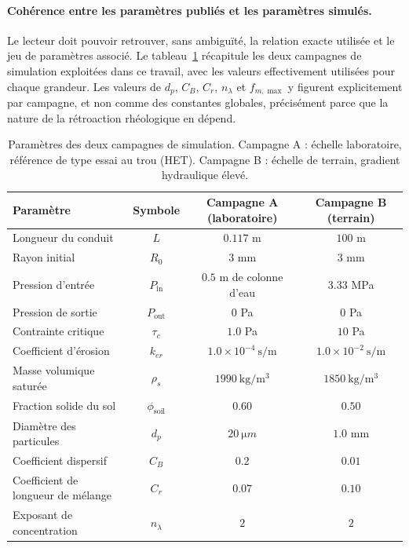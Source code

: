 \documentclass[11pt,a4paper]{report}
\newcommand{\phisol}{\phi_{\mathrm{soil}}}
\begin{document}
\paragraph{Cohérence entre les paramètres publiés et les paramètres simulés.} Le lecteur doit pouvoir
retrouver, sans ambiguïté, la relation exacte utilisée et le jeu de paramètres associé. Le
tableau~\ref{tab:param-campagnes} récapitule les deux campagnes de simulation exploitées dans ce travail,
avec les valeurs effectivement utilisées pour chaque grandeur. Les valeurs de \(d_p\), \(C_B\), \(C_r\),
\(n_\lambda\) et \(f_{m,\max}\) y figurent explicitement par campagne, et non comme des constantes
globales, précisément parce que la nature de la rétroaction rhéologique en dépend.

\begin{table}[H]
\centering
\caption{Paramètres des deux campagnes de simulation. Campagne A : échelle laboratoire, référence de
type essai au trou (HET). Campagne B : échelle de terrain, gradient hydraulique élevé.}
\label{tab:param-campagnes}
\small
\begin{tabular}{lccc}
\toprule
Paramètre & Symbole & Campagne A (laboratoire) & Campagne B (terrain) \\
\midrule
Longueur du conduit & \(L\) & \(0.117\) m & \(100\) m \\
Rayon initial & \(R_0\) & \(3\) mm & \(3\) mm \\
Pression d'entrée & \(P_{\mathrm{in}}\) & \(0.5\) m de colonne d'eau & \(3.33\) MPa \\
Pression de sortie & \(P_{\mathrm{out}}\) & \(0\) Pa & \(0\) Pa \\
Contrainte critique & \(\tau_c\) & \(1.0\) Pa & \(10\) Pa \\
Coefficient d'érosion & \(k_{er}\) & \(1.0\times10^{-4}\ \mathrm{s/m}\) & \(1.0\times10^{-2}\ \mathrm{s/m}\) \\
Masse volumique saturée & \(\rho_s\) & \(1990\ \mathrm{kg/m^3}\) & \(1850\ \mathrm{kg/m^3}\) \\
Fraction solide du sol & \(\phisol\) & \(0.60\) & \(0.50\) \\
Diamètre des particules & \(d_p\) & \(20\ \si{\micro m}\) & \(1.0\) mm \\
Coefficient dispersif & \(C_B\) & \(0.2\) & \(0.01\) \\
Coefficient de longueur de mélange & \(C_r\) & \(0.07\) & \(0.10\) \\
Exposant de concentration & \(n_\lambda\) & \(2\) & \(2\) \\

\end{tabular}
\end{table}
\end{document}
